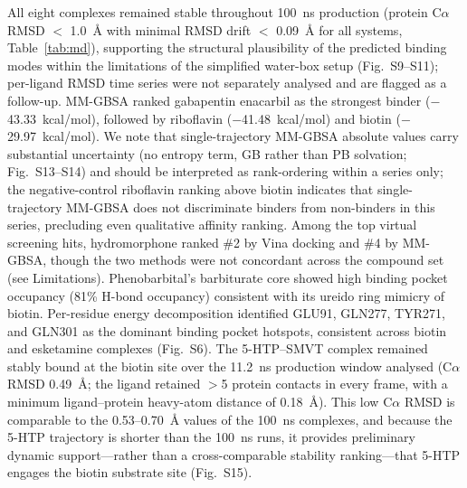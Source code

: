 \documentclass[10pt,letterpaper]{article}
\begin{document}
All eight complexes remained stable throughout 100~ns production (protein C$\alpha$ RMSD $<$ 1.0~\AA{} with minimal RMSD drift $<$ 0.09~\AA{} for all systems, Table~\ref{tab:md}), supporting the structural plausibility of the predicted binding modes within the limitations of the simplified water-box setup (Fig.~S9--S11); per-ligand RMSD time series were not separately analysed and are flagged as a follow-up. MM-GBSA ranked gabapentin enacarbil as the strongest binder ($-$43.33~kcal/mol), followed by riboflavin ($-$41.48~kcal/mol) and biotin ($-$29.97~kcal/mol). We note that single-trajectory MM-GBSA absolute values carry substantial uncertainty (no entropy term, GB rather than PB solvation; Fig.~S13--S14) and should be interpreted as rank-ordering within a series only; the negative-control riboflavin ranking above biotin indicates that single-trajectory MM-GBSA does not discriminate binders from non-binders in this series, precluding even qualitative affinity ranking. Among the top virtual screening hits, hydromorphone ranked \#2 by Vina docking and \#4 by MM-GBSA, though the two methods were not concordant across the compound set (see Limitations). Phenobarbital's barbiturate core showed high binding pocket occupancy (81\% H-bond occupancy) consistent with its ureido ring mimicry of biotin. Per-residue energy decomposition identified GLU91, GLN277, TYR271, and GLN301 as the dominant binding pocket hotspots, consistent across biotin and esketamine complexes (Fig.~S6). The 5-HTP--SMVT complex remained stably bound at the biotin site over the 11.2~ns production window analysed (C$\alpha$ RMSD 0.49~\AA{}; the ligand retained $>$5 protein contacts in every frame, with a minimum ligand--protein heavy-atom distance of 0.18~\AA{}). This low C$\alpha$ RMSD is comparable to the 0.53--0.70~\AA{} values of the 100~ns complexes, and because the 5-HTP trajectory is shorter than the 100~ns runs, it provides preliminary dynamic support---rather than a cross-comparable stability ranking---that 5-HTP engages the biotin substrate site (Fig.~S15).
\end{document}
